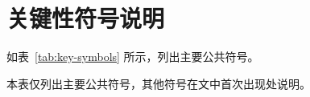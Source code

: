 \section{关键性符号说明}
如表~\ref{tab:key-symbols} 所示，列出主要公共符号。
\begin{GMCMSymbolTable}{本表仅列出主要公共符号，其他符号在文中首次出现处说明。}
\end{GMCMSymbolTable}
